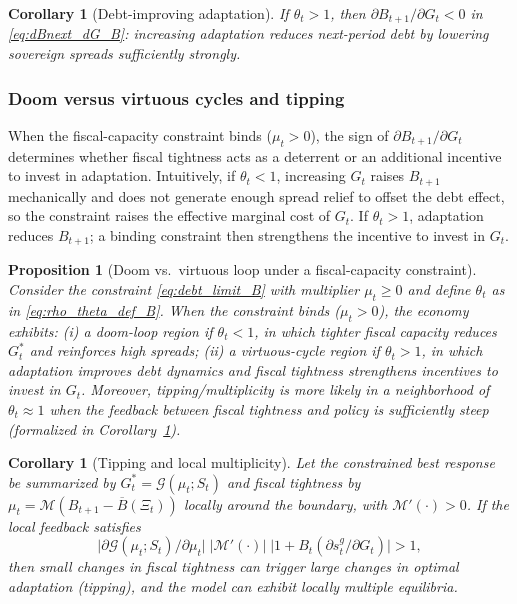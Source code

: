 \documentclass[12pt]{article}
\newtheorem{corollary}[theorem]{Corollary}
\newtheorem{proposition}{Proposition}
\begin{document}
\begin{corollary}[Debt-improving adaptation]
\label{cor:debt_improving_B}
If $\theta_t>1$, then $\partial B_{t+1}/\partial G_t<0$ in \eqref{eq:dBnext_dG_B}: increasing adaptation reduces next-period debt
by lowering sovereign spreads sufficiently strongly.
\end{corollary}

\subsubsection{Doom versus virtuous cycles and tipping}
\label{subsec:doom_virtuous_B}

When the fiscal-capacity constraint binds ($\mu_t>0$), the sign of $\partial B_{t+1}/\partial G_t$ determines whether fiscal
tightness acts as a deterrent or an additional incentive to invest in adaptation. Intuitively, if $\theta_t<1$, increasing $G_t$
raises $B_{t+1}$ mechanically and does not generate enough spread relief to offset the debt effect, so the constraint raises the
effective marginal cost of $G_t$. If $\theta_t>1$, adaptation reduces $B_{t+1}$; a binding constraint then strengthens the incentive
to invest in $G_t$.

\begin{proposition}[Doom vs.\ virtuous loop under a fiscal-capacity constraint]
\label{prop:doom_virtuous_regimes}
Consider the constraint \eqref{eq:debt_limit_B} with multiplier $\mu_t\ge 0$ and define $\theta_t$ as in \eqref{eq:rho_theta_def_B}.
When the constraint binds ($\mu_t>0$), the economy exhibits:
(i) a doom-loop region if $\theta_t<1$, in which tighter fiscal capacity reduces $G_t^*$ and reinforces high spreads;
(ii) a virtuous-cycle region if $\theta_t>1$, in which adaptation improves debt dynamics and fiscal tightness strengthens incentives
to invest in $G_t$.
Moreover, tipping/multiplicity is more likely in a neighborhood of $\theta_t\approx 1$ when the feedback between fiscal tightness and
policy is sufficiently steep (formalized in Corollary~\ref{cor:tipping_B}).
\end{proposition}

\begin{corollary}[Tipping and local multiplicity]
\label{cor:tipping_B}
Let the constrained best response be summarized by $G_t^*=\mathcal{G}(\mu_t;S_t)$ and fiscal tightness by
$\mu_t=\mathcal{M}(B_{t+1}-\overline B(\Xi_t))$ locally around the boundary, with $\mathcal{M}'(\cdot)>0$.
If the local feedback satisfies
\begin{equation}
\big|\partial \mathcal{G}(\mu_t;S_t)/\partial \mu_t\big|\;
\big|\mathcal{M}'(\cdot)\big|\;
\big|1+B_t(\partial s^g_t/\partial G_t)\big|
>1,
\label{eq:tipping_condition_B}
\end{equation}
then small changes in fiscal tightness can trigger large changes in optimal adaptation (tipping), and the model can exhibit
locally multiple equilibria.
\end{corollary}
\end{document}
